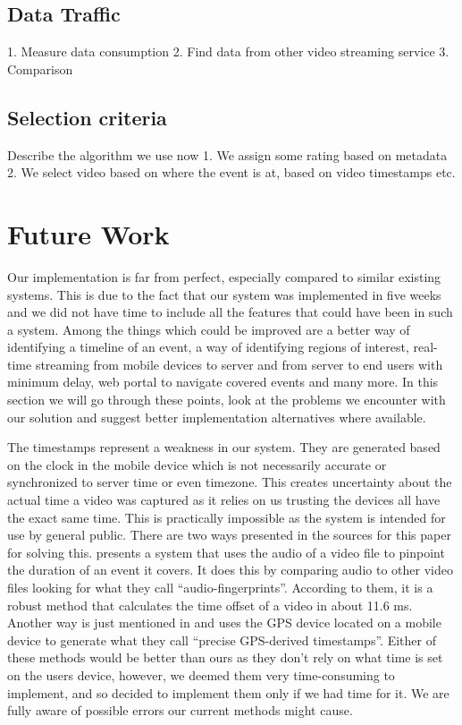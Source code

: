 \documentclass[conference]{IEEEtran}
\begin{document}
\subsection{Data Traffic} 

1. Measure data consumption
2. Find data from other video streaming service
3. Comparison

\subsection{Selection criteria}

Describe the algorithm we use now
1. We assign some rating based on metadata
2. We select video based on where the event is at, based on video timestamps
etc.

\section{Future Work}

Our implementation is far from perfect, especially compared to similar existing systems.
This is due to the fact that our system was implemented in five weeks and 
we did not have time to include all the features that could have been in such a system.
Among the things which could be improved are a better way of identifying a timeline of an event,
a way of identifying regions of interest, real-time streaming from mobile devices to server 
and from server to end users with minimum delay, web portal to navigate covered events and many more.
In this section we will go through these points, look at the problems we encounter with our solution 
and suggest better implementation alternatives where available.

The timestamps represent a weakness in our system.
They are generated based on the clock in the mobile device which is not necessarily accurate or 
synchronized to server time or even timezone. 
This creates uncertainty about the actual time a video was captured as it relies on us trusting the devices all have the exact same time.
This is practically impossible as the system is intended for use by general public. 
There are two ways presented in the sources for this paper for solving this. 
\cite{shrestha_automatic_2010} presents a system that uses the audio of a video file to pinpoint the duration of an event it covers.
It does this by comparing audio to other video files looking for what they call “audio-fingerprints”. 
According to them, it is a robust method that calculates the time offset of a video in about 11.6 ms. 
Another way is just mentioned in \cite{ jain_focus:_2013} and uses the GPS device located on a mobile device
to generate what they call “precise GPS-derived timestamps”.
Either of these methods would be better than ours as they don’t rely on what time is set on the users device,
however, we deemed them very time-consuming to implement, and so decided to implement them only if we had time for it.
We are fully aware of possible errors our current methods might cause.
\end{document}
